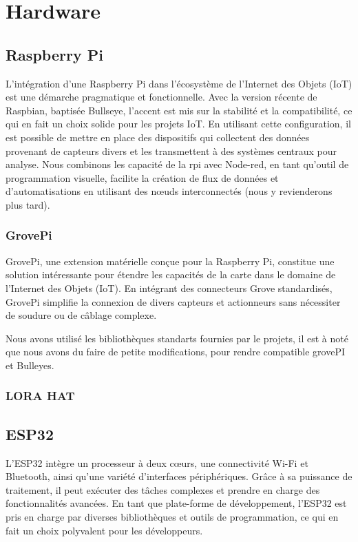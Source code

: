 \chapter{Hardware}
\section{Raspberry Pi}
L'intégration d'une Raspberry Pi dans l'écosystème de l'Internet des Objets (IoT) est une démarche pragmatique et fonctionnelle. Avec la version récente de Raspbian, baptisée Bullseye, l'accent est mis sur la stabilité et la compatibilité, ce qui en fait un choix solide pour les projets IoT. En utilisant cette configuration, il est possible de mettre en place des dispositifs qui collectent des données provenant de capteurs divers et les transmettent à des systèmes centraux pour analyse.
Nous combinons les capacité de la rpi avec Node-red,  en tant qu'outil de programmation visuelle, facilite la création de flux de données et d'automatisations en utilisant des nœuds interconnectés (nous y revienderons plus tard).
\subsection{GrovePi}
GrovePi, une extension matérielle conçue pour la Raspberry Pi, constitue une solution intéressante pour étendre les capacités de la carte dans le domaine de l'Internet des Objets (IoT). En intégrant des connecteurs Grove standardisés, GrovePi simplifie la connexion de divers capteurs et actionneurs sans nécessiter de soudure ou de câblage complexe.

Nous avons utilisé les bibliothèques standarts fournies par le projets, il est à noté que nous avons du faire de petite modifications, pour rendre compatible grovePI et Bulleyes.
\subsection{LORA HAT}
\section{ESP32}
L'ESP32 intègre un processeur à deux cœurs, une connectivité Wi-Fi et Bluetooth, ainsi qu'une variété d'interfaces périphériques. Grâce à sa puissance de traitement, il peut exécuter des tâches complexes et prendre en charge des fonctionnalités avancées. En tant que plate-forme de développement, l'ESP32 est pris en charge par diverses bibliothèques et outils de programmation, ce qui en fait un choix polyvalent pour les développeurs.

